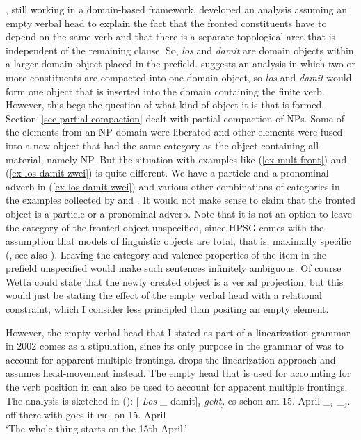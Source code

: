 \documentclass[output=paper,biblatex,babelshorthands,newtxmath,draftmode,colorlinks,citecolor=brown]{langscibook}
\begin{document}
\citet{Mueller2002c}, still working in a domain-based framework, developed an analysis assuming an
empty verbal head to explain the fact that the fronted constituents have to depend on the same verb
and that there is a separate topological area that is independent of the remaining clause. So,
\emph{los} and \emph{damit} are domain objects within a larger domain object placed in the
prefield. \citet{Wetta2011a} suggests an analysis in which two or more constituents are compacted
into one domain object, so \emph{los} and \emph{damit} would form one object that is inserted into
the domain containing the finite verb. However, this begs the question of what kind of object it is
that is formed. Section~\ref{sec-partial-compaction} dealt with partial compaction of NPs. Some of
the elements from an NP domain were liberated and other elements were fused into a new object that
had the same category as the object containing all material, namely NP. But the situation with
examples like (\ref{ex-mult-front}) and (\ref{ex-los-damit-zwei}) is quite different. We have a
particle and a pronominal adverb in (\ref{ex-los-damit-zwei}) and various other combinations of
categories in the examples collected by \citet{Mueller2003b,Mueller2005e,Mueller2013a} and \citet{Bildhauer2011a}. It would
not make sense to claim that the fronted object is a particle or a pronominal adverb. Note that it
is not an option to leave the category of the fronted object unspecified, since HPSG comes with the
assumption that models of linguistic objects are total, that is, maximally specific
(\citealp{King99a-u}, see also ). Leaving the category and
valence properties of the item in the prefield unspecified would make such sentences infinitely
ambiguous. Of course Wetta could state that the newly created object is a verbal projection, but
this would just be stating the effect of the empty verbal head with a relational constraint, which
I consider less principled than positing an empty element.

However, the empty verbal head that I stated as part of a linearization grammar in 2002 comes as a stipulation, since its
only purpose in the grammar of  was to account for apparent multiple
frontings. \citet{Mueller2005d,MuellerGS} drops the linearization approach and assumes head-movement
instead. The empty head that is used for accounting for the verb position in  can also be used
to account for apparent multiple frontings. The analysis is sketched in ():
\largerpage
\eal
\ex
\label{ex-zum-zweiten-anal-zwei}%
\ex
\gll {}[ \emph{Los} \_ damit]$_i$  \emph{geht}$_j$ es schon am 15. April \_$_i$ \_$_j$.\\
     {}          off        {}        there.with   goes it \textsc{prt} on 15. April\\
\glt `The whole thing starts on the 15th April.'
\end{document}
